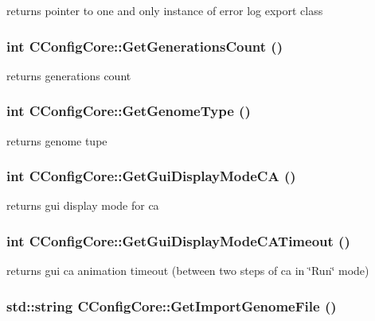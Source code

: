 \label{classCConfigCore_acefc129bafcc6fb8a22c901b74d0c65a}
returns pointer to one and only instance of error log export class \hypertarget{classCConfigCore_ae4dbc2fe07b0c5efa776a2e4ccfb47e4}{
\subsubsection[{GetGenerationsCount}]{\setlength{\rightskip}{0pt plus 5cm}int CConfigCore::GetGenerationsCount ()}}
\label{classCConfigCore_ae4dbc2fe07b0c5efa776a2e4ccfb47e4}
returns generations count \hypertarget{classCConfigCore_a10b590690cbe05c9ffd785a82937a657}{
\subsubsection[{GetGenomeType}]{\setlength{\rightskip}{0pt plus 5cm}int CConfigCore::GetGenomeType ()}}
\label{classCConfigCore_a10b590690cbe05c9ffd785a82937a657}
returns genome tupe \hypertarget{classCConfigCore_af95425d2bb138a4daa6343ab3d8e0389}{
\subsubsection[{GetGuiDisplayModeCA}]{\setlength{\rightskip}{0pt plus 5cm}int CConfigCore::GetGuiDisplayModeCA ()}}
\label{classCConfigCore_af95425d2bb138a4daa6343ab3d8e0389}
returns gui display mode for ca \hypertarget{classCConfigCore_ac7b29595aba0f65949b9dd6a4a069c92}{
\subsubsection[{GetGuiDisplayModeCATimeout}]{\setlength{\rightskip}{0pt plus 5cm}int CConfigCore::GetGuiDisplayModeCATimeout ()}}
\label{classCConfigCore_ac7b29595aba0f65949b9dd6a4a069c92}
returns gui ca animation timeout (between two steps of ca in \char`\"{}Run\char`\"{} mode) \hypertarget{classCConfigCore_a701fd27f77ab5e83d5e050a5bbaadc80}{
\subsubsection[{GetImportGenomeFile}]{\setlength{\rightskip}{0pt plus 5cm}std::string CConfigCore::GetImportGenomeFile ()}}
